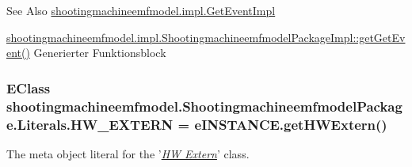 \begin{DoxySeeAlso}{See Also}
\hyperlink{classshootingmachineemfmodel_1_1impl_1_1_get_event_impl}{shootingmachineemfmodel.\-impl.\-Get\-Event\-Impl} 

\hyperlink{classshootingmachineemfmodel_1_1impl_1_1_shootingmachineemfmodel_package_impl_afdfe7cab56afecf4b421d94f8b82aebe}{shootingmachineemfmodel.\-impl.\-Shootingmachineemfmodel\-Package\-Impl\-::get\-Get\-Event()} Generierter Funktionsblock 
\end{DoxySeeAlso}
\hypertarget{interfaceshootingmachineemfmodel_1_1_shootingmachineemfmodel_package_1_1_literals_a1cb9e63ff1a806fd94974a6efeb9b059}{
\subsubsection[{H\-W\-\_\-\-E\-X\-T\-E\-R\-N}]{\setlength{\rightskip}{0pt plus 5cm}E\-Class shootingmachineemfmodel.\-Shootingmachineemfmodel\-Package.\-Literals.\-H\-W\-\_\-\-E\-X\-T\-E\-R\-N = e\-I\-N\-S\-T\-A\-N\-C\-E.\-get\-H\-W\-Extern()}}\label{interfaceshootingmachineemfmodel_1_1_shootingmachineemfmodel_package_1_1_literals_a1cb9e63ff1a806fd94974a6efeb9b059}
The meta object literal for the '\hyperlink{classshootingmachineemfmodel_1_1impl_1_1_h_w_extern_impl}{{\itshape H\-W Extern}}' class.

